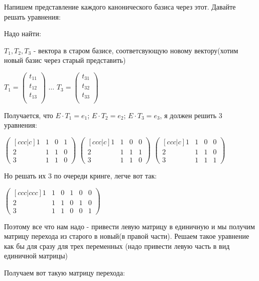 \documentclass{article}
\begin{document}
Напишем представление каждого канонического базиса через этот. Давайте решать уравнения:


Надо найти:

$T_1,T_2, T_3$ - вектора в старом базисе, соответсвующую новому вектору(хотим новый базис через старый представить)

$T_1 = \begin{pmatrix}
    t_{11} \\ 
    t_{12} \\ 
    t_{13} \\ 
\end{pmatrix}$ $\ldots$ $T_3 = \begin{pmatrix}
    t_{31} \\ 
    t_{32} \\ 
    t_{33} \\ 
\end{pmatrix}$

Получается, что $E\cdot T_1 = e_1$; $E\cdot T_2 = e_2$; $E\cdot T_3 = e_3$, я должен решить 3 уравнения:

$
\begin{pmatrix}[ccc|c]
   1 &1 &0&1   \\
    2 &1 &1&0 \\
    3& 1&1&0
\end{pmatrix}$
$
\begin{pmatrix}[ccc|c]
   1 &1 &0&0   \\
    2 &1 &1&1 \\
    3& 1&1&0
\end{pmatrix}$
$
\begin{pmatrix}[ccc|c]
   1 &1 &0&0   \\
    2 &1 &1&0 \\
    3& 1&1&1
\end{pmatrix}$

Но решать их 3 по очереди кринге, легче вот так:

$
\begin{pmatrix}[ccc|ccc]
   1 &1 &0&1 & 0 & 0  \\
    2 &1 &1&0 & 1 & 0\\
    3& 1&1&0 & 0 & 1
\end{pmatrix}$

Поэтому все что нам надо - привести левую матрицу в единичную и мы получим матрицу перехода из старого в новый(в правой части). Решаем такое уравнение как бы для сразу для трех переменных (надо привести левую часть в вид единичной матрицы)

Получаем вот такую матрицу перехода:
\end{document}
